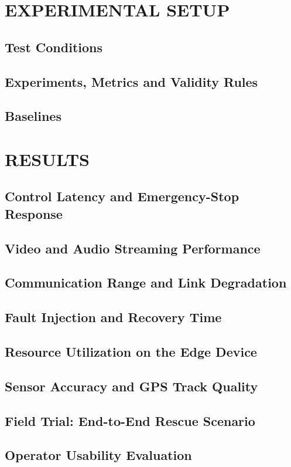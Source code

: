 \chapter{EXPERIMENTAL SETUP}
\section{Test Conditions}
\section{Experiments, Metrics and Validity Rules}
\section{Baselines}

\chapter{RESULTS}
\section{Control Latency and Emergency-Stop Response}
\section{Video and Audio Streaming Performance}
\section{Communication Range and Link Degradation}
\section{Fault Injection and Recovery Time}
\section{Resource Utilization on the Edge Device}
\section{Sensor Accuracy and GPS Track Quality}
\section{Field Trial: End-to-End Rescue Scenario}
\section{Operator Usability Evaluation}
